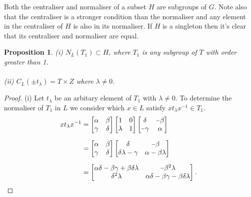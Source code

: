 \documentclass[a4paper , 11pt]{book}
\newcommand{\minus}{\scalebox{0.75}[1.0]{$-$}}
\newtheorem{proposition}[theorem]{Proposition}
\theoremstyle{definition}
\theoremstyle{remark}
\begin{document}
Both the centraliser and normaliser of a subset $H$ are subgroups of $G$. Note also that the centraliser is a stronger condition than the normaliser and any element in the centraliser of $H$ is also in its normaliser. If $H$ is a singleton then it's clear that its centraliser and normaliser are equal.\\

\begin{proposition}\label{6.4i}
(i) $N_L(T_1) \subset H$, where $T_1$ is any subgroup of $T$ with order greater than 1. \\
\\
(ii) $C_L(\pm t_\lambda) = T \times Z$ where $\lambda \neq 0$.
\end{proposition}

\begin{proof} (i) Let $t_\lambda$ be an arbitary element of $T_1$ with $\lambda \neq 0$. To determine the normaliser of $T_1$ in $L$ we consider which $x \in L$ satisfy $x t_\lambda x^{-1} \in T_1$.
\begin{align*} x t_\lambda x^{-1} &= \begin{bmatrix} \alpha & \beta \\ \gamma & \delta \end{bmatrix} \begin{bmatrix} 1 & 0 \\ \lambda & 1 \end{bmatrix} \begin{bmatrix} \delta & \minus \beta \\ \minus \gamma & \alpha \end{bmatrix}
\\[1.5ex] &= \begin{bmatrix} \alpha & \beta \\ \gamma & \delta \end{bmatrix} \begin{bmatrix} \delta & \minus \beta \\ \delta \lambda - \gamma & \alpha - \beta \lambda \end{bmatrix}
\\[1.5ex] &= \begin{bmatrix} \alpha \delta - \beta \gamma + \beta \delta \lambda & \minus \beta^2  \lambda \\ \delta^2 \lambda & \alpha \delta - \beta \gamma - \beta \delta \lambda \end{bmatrix}.
\end{align*}


\end{proof}
\end{document}
